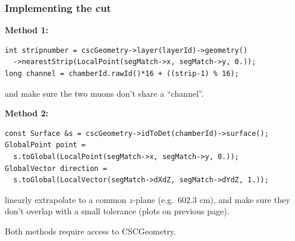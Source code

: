 \documentclass[compress]{beamer}
\begin{document}
\begin{frame}[fragile]
\frametitle{Implementing the cut}

{\bf Method 1:}

\begin{verbatim}
int stripnumber = cscGeometry->layer(layerId)->geometry()
  ->nearestStrip(LocalPoint(segMatch->x, segMatch->y, 0.));
long channel = chamberId.rawId()*16 + ((strip-1) % 16);
\end{verbatim}

\vspace{-0.2 cm}
and make sure the two muons don't share a ``channel''.

\vfill
{\bf Method 2:}
\begin{verbatim}
const Surface &s = cscGeometry->idToDet(chamberId)->surface();
GlobalPoint point =
  s.toGlobal(LocalPoint(segMatch->x, segMatch->y, 0.));
GlobalVector direction =
  s.toGlobal(LocalVector(segMatch->dXdZ, segMatch->dYdZ, 1.));
\end{verbatim}

\vspace{-0.2 cm}
linearly extrapolate to a common $z$-plane (e.g.\ 602.3 cm), and make
sure they don't overlap with a small tolerance (plots on previous page).

\vfill
Both methods require access to CSCGeometry.
\end{frame}
\end{document}
